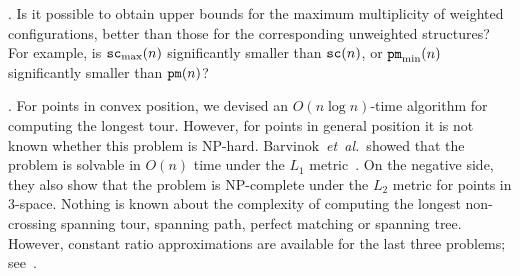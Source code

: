 \documentclass[11pt]{article}
\def\etal{{\it et~al.}\,}
\def\sc{{\tt sc}}
\def\pm{{\tt pm}}
\begin{document}
. Is it possible to obtain upper bounds for the maximum
multiplicity of weighted configurations, better than those for the
corresponding unweighted structures? For example, is $\sc_{\rm max}(n)$
significantly smaller than $\sc(n)$, or $\pm_{\rm min}(n)$
significantly smaller than $\pm(n)$?

. For points in convex position, we devised an $O(n\log n)$-time
algorithm for computing the longest tour.
However, for points in general position it is not known
whether this problem is NP-hard.
Barvinok~\etal\cite{BFJ+98} showed that the problem is solvable in
$O(n)$ time under the $L_1$ metric~\cite{BFJ+98}.
On the negative side, they also show that the problem is
NP-complete under the $L_2$ metric for points in 3-space.
Nothing is known about the complexity of computing the
longest non-crossing spanning tour, spanning path,
perfect matching or spanning tree. However, constant ratio
approximations are available for the last three problems;
see~\cite{ARS95,DT10}.
\end{document}

